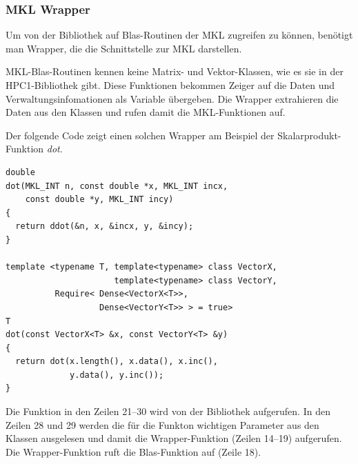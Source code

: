 \subsubsection{MKL Wrapper}
Um von der Bibliothek auf Blas-Routinen der MKL zugreifen zu können, benötigt man Wrapper, die die Schnittstelle zur MKL darstellen.

MKL-Blas-Routinen kennen keine Matrix- und Vektor-Klassen, wie es sie in der HPC1-Bibliothek gibt. Diese Funktionen bekommen Zeiger auf die Daten und Verwaltungsinfomationen als Variable übergeben.
Die Wrapper extrahieren die Daten aus den Klassen und rufen damit die MKL-Funktionen auf.

Der folgende Code zeigt einen solchen Wrapper am Beispiel der Skalarprodukt-Funktion \textit{dot}.
\lstset{numbers=left,firstnumber=14}
\begin{lstlisting}
double
dot(MKL_INT n, const double *x, MKL_INT incx,
    const double *y, MKL_INT incy)
{
  return ddot(&n, x, &incx, y, &incy);
}

template <typename T, template<typename> class VectorX,
                      template<typename> class VectorY,
          Require< Dense<VectorX<T>>,
                   Dense<VectorY<T>> > = true>
T
dot(const VectorX<T> &x, const VectorY<T> &y)
{
  return dot(x.length(), x.data(), x.inc(), 
             y.data(), y.inc());
}
\end{lstlisting}
Die Funktion in den Zeilen 21--30 wird von der Bibliothek aufgerufen.
In den Zeilen 28 und 29 werden die für die Funkton wichtigen Parameter aus den Klassen ausgelesen und damit die Wrapper-Funktion (Zeilen 14--19) aufgerufen. Die Wrapper-Funktion ruft die Blas-Funktion auf (Zeile 18).


%
%

